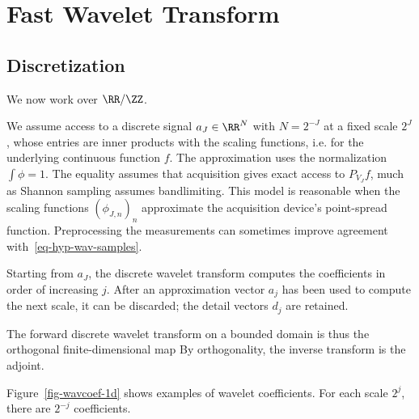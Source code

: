 \section{Fast Wavelet Transform}\label{sec-fast-wavelet-transform}

   
\subsection{Discretization}

We now work over $\RR/\ZZ$.
 
We assume access to a discrete signal $a_J \in \RR^N$ with $N = 2^{-J}$ at a fixed scale $2^J$, whose entries are inner products with the scaling functions, i.e.
for the underlying continuous function $f$. The approximation uses the normalization $\int\phi=1$. The equality assumes that acquisition gives exact access to $P_{V_J}f$, much as Shannon sampling assumes bandlimiting. This model is reasonable when the scaling functions $(\phi_{J,n})_n$ approximate the acquisition device's point-spread function. Preprocessing the measurements can sometimes improve agreement with~\eqref{eq-hyp-wav-samples}.

Starting from $a_J$, the discrete wavelet transform computes the coefficients
in order of increasing $j$. After an approximation vector $a_j$ has been used to compute the next scale, it can be discarded; the detail vectors $d_j$ are retained.

The forward discrete wavelet transform on a bounded domain is thus the orthogonal finite-dimensional map
By orthogonality, the inverse transform is the adjoint.


Figure~\ref{fig-wavcoef-1d} shows examples of wavelet coefficients. For each scale $2^j$, there are $2^{-j}$ coefficients.




